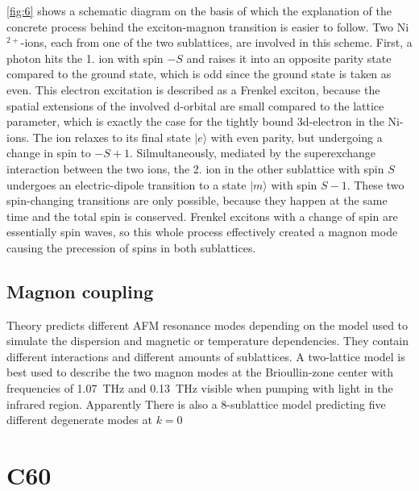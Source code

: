 \FloatBarrier
\autoref{fig:6} shows a schematic diagram on the basis of which the explanation of the concrete process behind the exciton-magnon transition is easier to follow.
Two Ni$^{2+}$-ions, each from one of the two sublattices, are involved in this scheme.
First, a photon hits the 1. ion with spin $-S$ and raises it into an opposite parity state compared to the ground state, which is odd since the ground state is taken as even.
This electron excitation is described as a Frenkel exciton, because the spatial extensions of the involved d-orbital are small compared to the lattice parameter, which is exactly the case for the tightly bound 3d-electron in the Ni-ions.
The ion relaxes to its final state $|e\rangle$ with even parity, but undergoing a change in spin to $-S+1$.
Silmultaneously, mediated by the superexchange interaction between the two ions, the 2. ion in the other sublattice with spin $S$ undergoes an electric-dipole transition to a state $|m\rangle$ with spin $S-1$.
These two spin-changing transitions are only possible, because they happen at the same time and the total spin is conserved.
Frenkel excitons with a change of spin are essentially spin waves, so this whole process effectively created a magnon mode causing the precession of spins in both sublattices.

\subsection{Magnon coupling}
Theory predicts different AFM resonance modes depending on the model used to simulate the dispersion and magnetic or temperature dependencies.
They contain different interactions and different amounts of sublattices.
A two-lattice model is best used to describe the two magnon modes at the Brioullin-zone center with frequencies of \qty{1.07}{THz} and \qty{0.13}{THz} visible when pumping with light in the infrared region.
Apparently
There is also a 8-sublattice model predicting five different degenerate modes at $k=0$ 

\section{C60}




